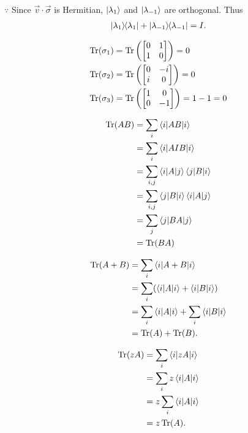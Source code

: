 $\because$ Since $\vec{v} \cdot \vec{\sigma}$ is Hermitian, $\ket{\lambda_1}$ and $\ket{\lambda_{-1}}$ are orthogonal.
Thus
\begin{align*}
	\ket{\lambda_1}\hspace{-1mm} \bra{\lambda_1} + \ket{\lambda_{-1}}\hspace{-1mm} \bra{\lambda_{-1}} = I.
\end{align*}


\begin{align*}
	\Tr (\sigma_1) &= \Tr \left(
		\begin{bmatrix}
		0 & 1 \\
		1 & 0
		\end{bmatrix}
	\right) = 0\\
%
	\Tr (\sigma_2) &= \Tr \left(
		\begin{bmatrix}
		0 & -i \\
		i & 0
		\end{bmatrix}
	\right) = 0\\
%
	\Tr (\sigma_3) &= \Tr \left(
	\begin{bmatrix}
		1 & 0 \\
		0 & -1
	\end{bmatrix}
	\right) = 1 -1 = 0\\
\end{align*}




\begin{align*}
	\operatorname{Tr} (AB) &= \sum_i \braket{i | AB | i}\\
		&=\sum_i \braket{i | A I B | i}\\
		&= \sum_{i,j} \braket{i | A | j}\braket{j | B | i}\\
		&= \sum_{i,j} \braket{j | B | i} \braket{i | A | j}\\
		&= \sum_j \braket{j | BA | j}\\
		&= \operatorname{Tr} (BA)
\end{align*}



\begin{align*}
	\operatorname{Tr} (A + B) &= \sum_i \braket{i | A+B | i}\\
		&= \sum_i (\braket{i|A|i}  + \braket{i | B | i}  )\\
		&= \sum_i \braket{i|A|i} + \sum_i \braket{i|B|i}\\
		&= \operatorname{Tr} (A) + \operatorname{Tr} (B).
\end{align*}

\begin{align*}
	\operatorname{Tr} (z A) &=  \sum_i \braket{i | z A | i}\\
		&= \sum_i z \braket{i | A | i}\\
		&= z \sum_i \braket{i | A | i}\\
		&= z \operatorname{Tr} (A).
\end{align*}





